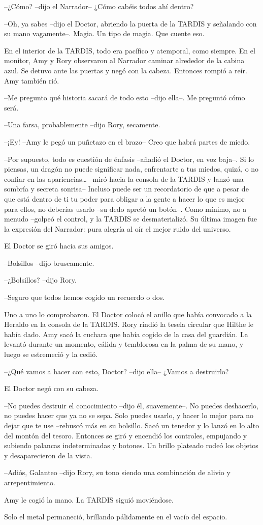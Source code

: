 {--¿Cómo? --dijo el Narrador-- ¿Cómo cabéis todos ahí dentro?}

{--Oh, ya sabes --dijo el Doctor, abriendo la puerta de la TARDIS y
	señalando con su mano vagamente--. Magia. Un tipo de magia. Que cuente
eso.}

\mbox{}

{En el interior de la TARDIS, todo era pacífico y atemporal, como
	siempre. En el monitor, Amy y Rory observaron al Narrador caminar
	alrededor de la cabina azul. Se detuvo ante las puertas y negó con la
cabeza. Entonces rompió a reír. Amy también rió.}

{--Me pregunto qué historia sacará de todo esto --dijo ella--. Me
preguntó cómo será.}

{--Una farsa, probablemente --dijo Rory, secamente.}

{--¡Ey! --Amy le pegó un puñetazo en el brazo-- Creo que habrá partes
de miedo.}

{--Por supuesto, todo es cuestión de énfasis --añadió el Doctor, en
	voz baja--. Si lo piensas, un dragón no puede significar nada,
	enfrentarte a tus miedos, quizá, o no confiar en las apariencias\ldots{}
	--miró hacia la consola de la TARDIS y lanzó una sombría y secreta
	sonrisa-- Incluso puede ser un recordatorio de que a pesar de que está
	dentro de ti tu poder para obligar a la gente a hacer lo que es mejor
	para ellos, no deberías usarlo --su dedo apretó un botón--. Como mínimo,
	no a menudo --golpeó el control, y la TARDIS se desmaterializó. Su
	última imagen fue la expresión del Narrador: pura alegría al oír el
mejor ruido del universo.}

{El Doctor se giró hacia sus amigos.}

{--Bolsillos --dijo bruscamente.}

{--¿Bolsillos? --dijo Rory.}

{--Seguro que todos hemos cogido un recuerdo o dos.}

{Uno a uno lo comprobaron. El Doctor colocó el anillo que había
	convocado a la Heraldo en la consola de la TARDIS\@. Rory rindió la tesela
	circular que Hilthe le había dado. Amy sacó la cuchara que había cogido
	de la casa del guardián. La levantó durante un momento, cálida y
temblorosa en la palma de su mano, y luego se estremeció y la cedió.}

{--¿Qué vamos a hacer con esto, Doctor? --dijo ella-- ¿Vamos a
destruirlo?}

{El Doctor negó con su cabeza.}

{--No puedes destruir el conocimiento --dijo él, suavemente--. No
	puedes deshacerlo, no puedes hacer que ya no se sepa. Solo puedes
	usarlo, y hacer lo mejor para no dejar que te use --rebuscó más en su
	bolsillo. Sacó un tenedor y lo lanzó en lo alto del montón del tesoro.
	Entonces se giró y encendió los controles, empujando y subiendo palancas
	indeterminadas y botones. Un brillo plateado rodeó los objetos y
desaparecieron de la vista.}

{--Adiós, Galanteo --dijo Rory, su tono siendo una combinación de
alivio y arrepentimiento.}

{Amy le cogió la mano. La TARDIS siguió moviéndose.}

{Solo el metal permaneció, brillando pálidamente en el vacío del
espacio.}
